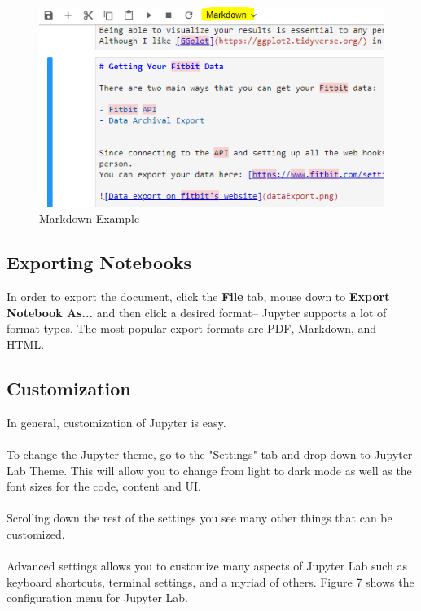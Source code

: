 \documentclass[pdftex,12pt]{artikel3}
\begin{document}
\begin{figure}[h!]
    \centering
    \includegraphics[width=15cm]{markdown.png}
    \caption{Markdown Example}
    \label{fig:markdownExample}
\end{figure}


\subsection{Exporting Notebooks}
In order to export the document, click the \textbf{File} tab, mouse down to \textbf{Export Notebook As...} and then click a desired format-- Jupyter supports a lot of format types.
The most popular export formats are PDF, Markdown, and HTML. 

\subsection{Customization}
In general, customization of Jupyter is easy.\\
\\
To change the Jupyter theme, go to the "Settings" tab and drop down to Jupyter Lab Theme. This will allow you to change from light to dark mode as well as the font sizes for the code, content and UI.\\
\\
Scrolling down the rest of the settings you see many other things that can be customized.\\
\\
Advanced settings allows you to customize many aspects of Jupyter Lab such as keyboard shortcuts, terminal settings, and a myriad of others. Figure 7 shows the configuration menu for Jupyter Lab.
\end{document}
